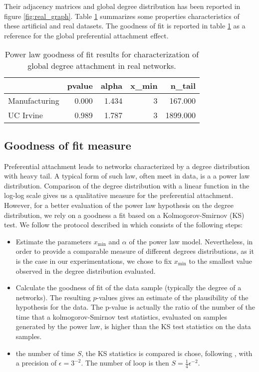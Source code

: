 \documentclass[a4paper, 12pt]{article}
\begin{document}
Their adjacency matrices and global degree distribution has been reported in figure \ref{fig:real_graph}.  Table \ref{table:real_graph} summarizes some properties characteristics of these artificial and real datasets. The goodness of fit is reported in table \ref{table:real_graph}  as a reference for the global preferential attachment effect. 



\begin{table}
\label{table:real_graph}
\caption{Power law goodness of fit results for characterization of global degree attachment in real networks.}
\centering
\begin{tabular}{lrrrr}
   &   pvalue &   alpha &   x\_min &   n\_tail \\
\hline
 Manufacturing &    0.000 &   1.434 &       3 &  167.000 \\
 UC Irvine     &    0.989 &   1.787 &       3 & 1899.000 \\
\hline
\end{tabular}
\end{table}


\subsection{Goodness of fit measure}

\label{sec:experiments-burst}
Preferential attachment leads to networks characterized by a degree distribution with heavy tail. A typical form of such law, often meet in data, is a a power law distribution. Comparison of the degree distribution with a linear function in the log-log scale  gives us a qualitative measure for the preferential attachment. However, for a better evaluation of the power law hypothesis on the degree distribution, we rely on a  goodness a fit based on a Kolmogorov-Smirnov (KS) test. We follow the protocol described in \cite{clauset2009power} which consists of the following steps:
\begin{itemize}
	\item Estimate the parameters $x_\text{min}$ and $\alpha$ of the power law model. Nevertheless, in order to provide a comparable measure of different degrees distributions, as it is the case in our experimentations, we chose to fix $x_\text{min}$  to the smallest value observed in the degree distribution evaluated.
	\item Calculate the goodness of fit of the data sample (typically the degree of a networks). The resulting $p$-values gives an estimate of the  plausibility of the hypothesis for the data. The p-value is actually the ratio of the number of the time that a kolmogorov-Smirnov test statistics, evaluated on samples generated by the power law, is higher than the KS test statistics on the data samples. 
    \item the number of time $S$, the KS statistics is compared is chose, following \cite{clauset2009power}, with a precision of $\epsilon = 3^{-2}$. The  number of loop is then $S = \frac{1}{4}\epsilon^{-2}$.
\end{itemize}
\end{document}
